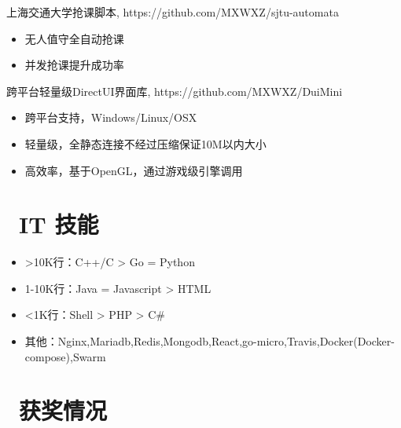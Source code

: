 \documentclass{resume}
\begin{document}
\begin{onehalfspacing}
    上海交通大学抢课脚本, https://github.com/MXWXZ/sjtu-automata
    \begin{itemize}
        \item 无人值守全自动抢课
        \item 并发抢课提升成功率
    \end{itemize}
\end{onehalfspacing}

\begin{onehalfspacing}
    跨平台轻量级DirectUI界面库, https://github.com/MXWXZ/DuiMini
    \begin{itemize}
        \item 跨平台支持，Windows/Linux/OSX
        \item 轻量级，全静态连接不经过压缩保证10M以内大小
        \item 高效率，基于OpenGL，通过游戏级引擎调用
    \end{itemize}
\end{onehalfspacing}


\section{\faCogs\ IT 技能}
\begin{itemize}[parsep=0.5ex]
    \item >10K行：C++/C > Go = Python
    \item 1-10K行：Java = Javascript > HTML
    \item <1K行：Shell > PHP > C\#
    \item 其他：Nginx,Mariadb,Redis,Mongodb,React,go-micro,Travis,Docker(Docker-compose),Swarm
\end{itemize}

\section{\faHeartO\ 获奖情况}
\end{document}

